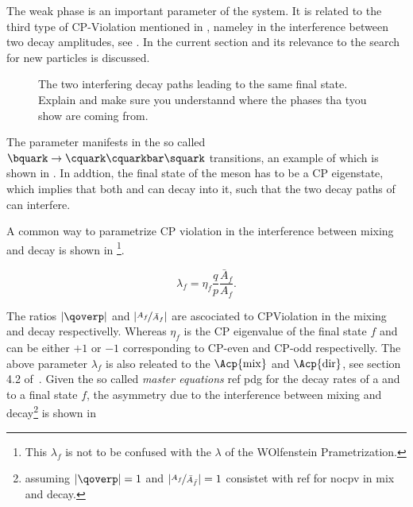 The weak phase \phis is an important parameter of the \BBbarSyst system. It is related to the third
type of CP-Violation mentioned in , nameley in the interference between
two decay amplitudes, see . In the current section \phis and its relevance to
the search for new particles is discussed.

\newcommand{\ffig}{f}
\newcommand{\phimixfig}{\phi_\text{mix}}
\newcommand{\phifig}{\phi_\text{dec}}
\newcommand{\phibarfig}{\kern 0.15em \overline{\kern -0.15em \phi_\text{dec} \kern -0.60em} \kern 0.60em}
\begin{figure}[h]
  \centering
  \resizebox{0.4\textwidth}{!}{}
  \caption{The two interfering decay paths leading to the same final state.
  {\color{red} Explain and make sure you understannd where the phases tha tyou show are coming from.}           }
  \label{interference}
\end{figure}

The parameter \phis manifests in the so called $\bquark \rightarrow \cquark\cquarkbar\squark $ transitions,
an example of which is shown in . In addtion, the final state of the \Bs meson has to be
a CP eigenstate, which implies that both \Bs and \Bsb can decay into it, such that the two decay paths
of  can interfere.

A common way to parametrize CP violation in the interference between mixing and decay is shown in 
\footnote{This $\lambda_f$ is not to be confused with the $\lambda$ of the WOlfenstein Prametrization.}.

\begin{equation}
 \lambda_{f} = \eta_f \frac{q}{p} \frac{\bar{A}_f}{A_f}. %
\label{lambda_cpv}
\end{equation}

\noindent The ratios $|\qoverp|$ and $|\nicefrac{A_f}{\bar{A}_{f}}|$ are ascociated to CPViolation in the mixing and decay respectivelly.
Whereas $\eta_f$ is the CP eigenvalue of the final state $f$ and can be either $+1$ or $-1$ corresponding to CP-even and CP-odd respectivelly.
The above parameter $\lambda_f$ is also releated to the $\Acp{\rm mix}$ and $\Acp{\rm dir}$, see section 4.2 of~\cite{DeBruyn-thesis}.
Given the so called {\it master equations}{\color{red} ref pdg} for the decay rates of a \Bs and \Bsb
to a final state $f$, the \CP asymmetry due to the interference between mixing and decay\footnote{assuming $|\qoverp|=1$ and $|\nicefrac{A_f}{\bar{A}_{\bar{f}}}| = 1$ consistet with {\color{red} ref for nocpv in mix and decay}.}
is shown in 

